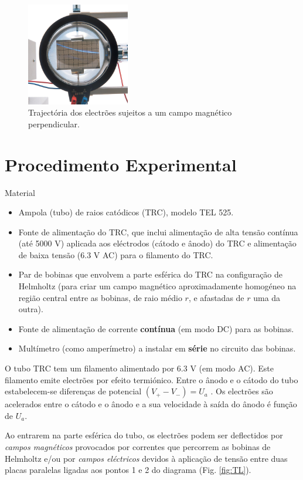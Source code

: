 \documentclass[a4paper,twoside,12pt]{article}      %
\begin{document}
\begin{figure}
	[hb]  \centering 
	\includegraphics[width=0.4\textwidth]{./fig4-Thomson_Electron-Deflection-Tube-D}
	\caption{Trajectória dos electrões sujeitos a um campo magnético perpendicular. \label{fig:Thomson_trajec}} 
\end{figure}

\newpage

\section{\sf Procedimento Experimental}
{ \large Material }
\begin{itemize}
	\item Ampola (tubo) de raios catódicos (TRC), modelo TEL 525.
	\item 	Fonte de alimentação do TRC, que inclui alimentação de alta tensão contínua 
	(até 5000 V) aplicada aos eléctrodos (cátodo e ânodo) do TRC e alimentação de baixa tensão
	(6.3 V AC) para o filamento do TRC.
	\item Par de bobinas que envolvem a parte esférica do TRC na configuração de
	Helmholtz (para criar um campo magnético aproximadamente homogéneo na
	região central entre as bobinas, de raio médio $r$, e afastadas de $r$ uma da outra).
	\item Fonte de alimentação de corrente \textbf{contínua} (em modo DC) para as bobinas.
	\item Multímetro (como amperímetro) a instalar em \textbf{série} no circuito das bobinas.
\end{itemize}

O tubo TRC tem um filamento alimentado por 6.3 V (em modo AC). Este filamento emite electrões por efeito termiónico. 
Entre o ânodo e o cátodo do tubo estabelecem-se diferenças de potencial $ (V_+ - V_-) = U_a$ . Os electrões são acelerados entre o cátodo e o ânodo e a sua velocidade à saída do ânodo é função de $U_a$. 

Ao entrarem na parte esférica do tubo, os electrões podem ser deflectidos por \emph{campos magnéticos} provocados por correntes que percorrem as bobinas de Helmholtz e/ou por \emph{campos eléctricos} devidos à aplicação de tensão entre duas placas paralelas ligadas aos pontos 1 e 2 do diagrama (Fig. \ref{fig:TL}).
\end{document}
